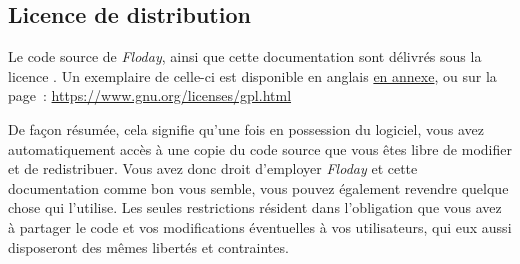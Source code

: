\subsection{Licence de distribution}

Le code source de \emph{Floday}, ainsi que cette documentation sont délivrés sous la licence .
Un exemplaire de celle-ci est disponible en anglais \hyperref[sec:gpl]{en annexe}, ou sur la page~: \url{https://www.gnu.org/licenses/gpl.html}

De façon résumée, cela signifie qu'une fois en possession du logiciel, vous avez automatiquement accès à une copie du code source que vous êtes libre de modifier et de redistribuer.
Vous avez donc droit d'employer \emph{Floday} et cette documentation comme bon vous semble, vous pouvez également revendre quelque chose qui l'utilise.
Les seules restrictions résident dans l'obligation que vous avez à partager le code et vos modifications éventuelles à vos utilisateurs, qui eux aussi disposeront des mêmes libertés et contraintes.
